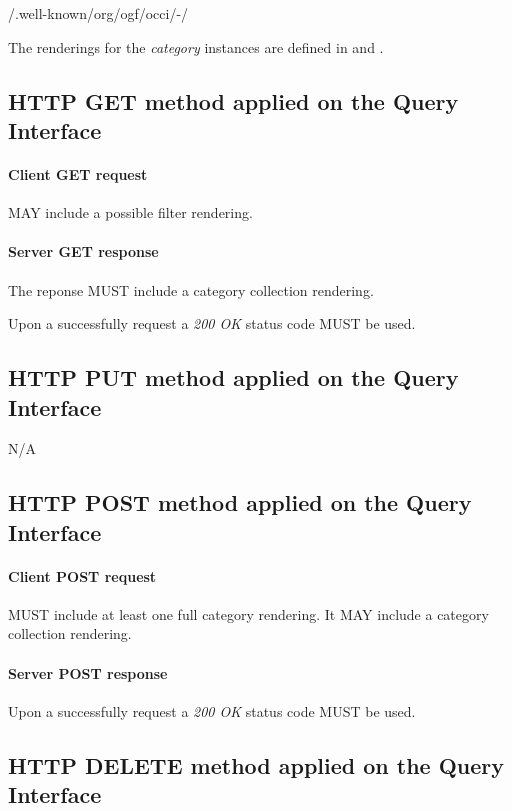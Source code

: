 \documentclass[10pt,a4paper]{article}
\begin{document}
	/.well-known/org/ogf/occi/-/

The renderings for the {\em category} instances are defined in \cite{occi:text} and \cite{occi:json}.

\subsection{HTTP GET method applied on the Query Interface}

\paragraph{Client GET request}
MAY include a possible filter rendering.

\paragraph{Server GET response}
The reponse MUST include a category collection rendering.

Upon a successfully request a \emph{200 OK} status code MUST be used.

\subsection{HTTP PUT method applied on the Query Interface}

N/A

\subsection{HTTP POST method applied on the Query Interface}

\paragraph{Client POST request}
MUST include at least one full category rendering. It MAY include a category collection rendering.

\paragraph{Server POST response}
Upon a successfully request a \emph{200 OK} status code MUST be used.

\subsection{HTTP DELETE method applied on the Query Interface}
\end{document}
